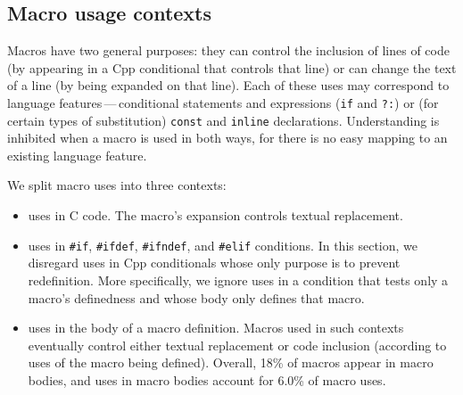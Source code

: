 \documentclass[10pt]{article}
\newcommand{\pkg}[1]{\textsf{#1}}
\begin{document}


\subsection{Macro usage contexts}
\label{sec:inconsistent-usage}

Macros have two general purposes: they can control the inclusion of lines
of code (by appearing in a Cpp conditional that controls that line) or can
change the text of a line (by being expanded on that line).  Each of these
uses may correspond to language features\,---\,conditional statements and
expressions (\texttt{if} and {\tt ?:}) or (for certain types of
substitution) {\tt const} and {\tt inline} declarations.  Understanding is
inhibited when a macro is used in both ways, for there is no easy mapping
to an existing language feature.


We split macro uses into three contexts:
\begin{itemize}\itemsep 0pt \parskip 0pt
\item uses in C code.   The macro's expansion controls textual
      replacement.
\item uses in \texttt{\#if}, \texttt{\#ifdef}, \texttt{\#ifndef}, and
  \texttt{\#elif} conditions.  In this section, we disregard uses in Cpp
  conditionals whose only purpose is to prevent redefinition.  More
  specifically, we ignore uses in a condition that tests only a macro's
  definedness and whose body only defines that macro.
\item uses in the body of a macro definition.
  Macros used in such contexts eventually control either textual
  replacement or code inclusion (according to uses of the macro being
  defined).  Overall, 18\% of macros appear in macro bodies, and uses in
  macro bodies account for 6.0\% of macro uses.
\end{itemize}
\end{document}
